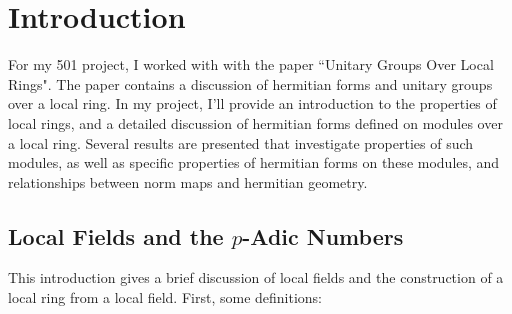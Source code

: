 \section{Introduction}

For my 501 project, I worked with with the paper ``Unitary Groups Over Local Rings"\cite{cruickshank}.
The paper contains a discussion of hermitian forms and unitary groups over a local ring.
In my project, I'll provide an introduction to the properties of local rings, and a detailed discussion of hermitian forms
defined on modules over a local ring.
Several results are presented that investigate properties of such modules, as well as specific properties of hermitian forms on these modules,
and relationships between norm maps and hermitian geometry.

\subsection{Local Fields and the $p$-Adic Numbers}

This introduction gives a brief discussion of local fields and the construction of a local ring from a local field.
First, some definitions:

